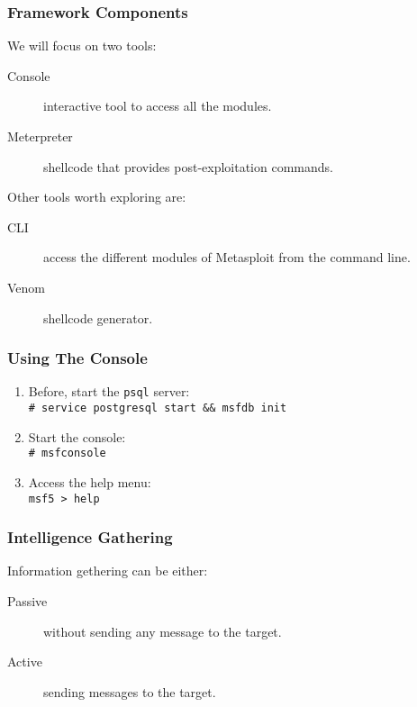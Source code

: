 \documentclass[aspectratio=169]{beamer}
\begin{document}
\begin{frame}
\frametitle{Framework Components}
We will focus on two tools: 

\begin{description}
    \item[Console] interactive tool to access all the modules.
    \item[Meterpreter] shellcode that provides post-exploitation commands.
\end{description}

\vspace{10pt}
Other tools worth exploring are:

\begin{description}
    \item[CLI] access the different modules of Metasploit from the command line.
    \item[Venom] shellcode generator.
\end{description}

\end{frame}

\begin{frame}

\frametitle{Using The Console}

\begin{enumerate}
    \item Before, start the \texttt{psql} server:\\
    \indent\texttt{\# service postgresql start \&\& msfdb init}\\
    \item Start the console:\\
    \indent\texttt{\# msfconsole}\\
    \item Access the help menu: \\
    \indent\texttt{msf5 > help}
\end{enumerate}

\end{frame}

\begin{frame}

\frametitle{Intelligence Gathering}

Information gethering can be either:
\begin{description}
    \item[Passive] without sending any message to the target.
    \item[Active] sending messages to the target.
\end{description}

\end{frame}
\end{document}
